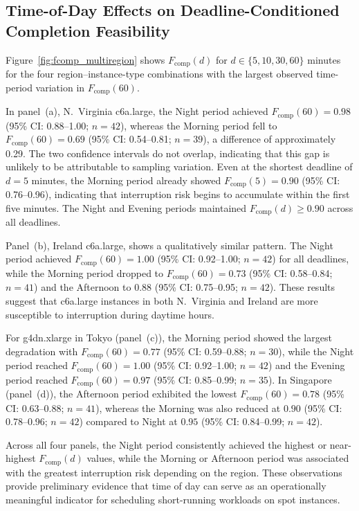 \documentclass[runningheads]{llncs}
\begin{document}
\subsection{Time-of-Day Effects on Deadline-Conditioned Completion Feasibility}

Figure~\ref{fig:fcomp_multiregion} shows $F_{\mathrm{comp}}(d)$ for $d \in \{5, 10, 30, 60\}$ minutes for the four region--instance-type combinations with the largest observed time-period variation in $F_{\mathrm{comp}}(60)$.

In panel~(a), N.~Virginia c6a.large, the Night period achieved $F_{\mathrm{comp}}(60) = 0.98$ (95\% CI: 0.88--1.00; $n=42$), whereas the Morning period fell to $F_{\mathrm{comp}}(60) = 0.69$ (95\% CI: 0.54--0.81; $n=39$), a difference of approximately 0.29. The two confidence intervals do not overlap, indicating that this gap is unlikely to be attributable to sampling variation. Even at the shortest deadline of $d = 5$ minutes, the Morning period already showed $F_{\mathrm{comp}}(5) = 0.90$ (95\% CI: 0.76--0.96), indicating that interruption risk begins to accumulate within the first five minutes. The Night and Evening periods maintained $F_{\mathrm{comp}}(d) \geq 0.90$ across all deadlines.

Panel~(b), Ireland c6a.large, shows a qualitatively similar pattern. The Night period achieved $F_{\mathrm{comp}}(60) = 1.00$ (95\% CI: 0.92--1.00; $n=42$) for all deadlines, while the Morning period dropped to $F_{\mathrm{comp}}(60) = 0.73$ (95\% CI: 0.58--0.84; $n=41$) and the Afternoon to $0.88$ (95\% CI: 0.75--0.95; $n=42$). These results suggest that c6a.large instances in both N.~Virginia and Ireland are more susceptible to interruption during daytime hours.

For g4dn.xlarge in Tokyo (panel~(c)), the Morning period showed the largest degradation with $F_{\mathrm{comp}}(60) = 0.77$ (95\% CI: 0.59--0.88; $n=30$), while the Night period reached $F_{\mathrm{comp}}(60) = 1.00$ (95\% CI: 0.92--1.00; $n=42$) and the Evening period reached $F_{\mathrm{comp}}(60) = 0.97$ (95\% CI: 0.85--0.99; $n=35$). In Singapore (panel~(d)), the Afternoon period exhibited the lowest $F_{\mathrm{comp}}(60) = 0.78$ (95\% CI: 0.63--0.88; $n=41$), whereas the Morning was also reduced at $0.90$ (95\% CI: 0.78--0.96; $n=42$) compared to Night at $0.95$ (95\% CI: 0.84--0.99; $n=42$).

Across all four panels, the Night period consistently achieved the highest or near-highest $F_{\mathrm{comp}}(d)$ values, while the Morning or Afternoon period was associated with the greatest interruption risk depending on the region. These observations provide preliminary evidence that time of day can serve as an operationally meaningful indicator for scheduling short-running workloads on spot instances.
\end{document}
